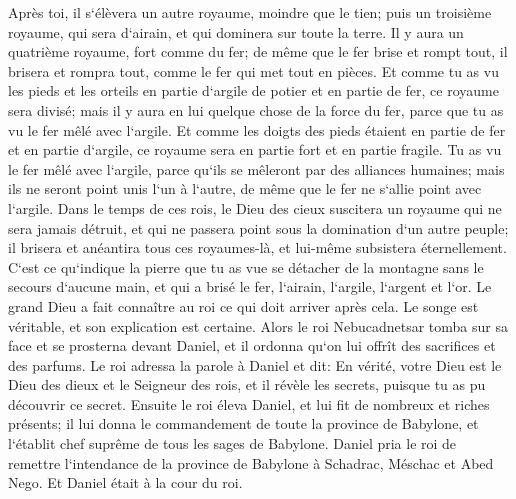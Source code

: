 \verse Après toi, il s`élèvera un autre royaume, moindre que le tien; puis un troisième royaume, qui sera d`airain, et qui dominera sur toute la terre. 
\verse Il y aura un quatrième royaume, fort comme du fer; de même que le fer brise et rompt tout, il brisera et rompra tout, comme le fer qui met tout en pièces. 
\verse Et comme tu as vu les pieds et les orteils en partie d`argile de potier et en partie de fer, ce royaume sera divisé; mais il y aura en lui quelque chose de la force du fer, parce que tu as vu le fer mêlé avec l`argile. 
\verse Et comme les doigts des pieds étaient en partie de fer et en partie d`argile, ce royaume sera en partie fort et en partie fragile. 
\verse Tu as vu le fer mêlé avec l`argile, parce qu`ils se mêleront par des alliances humaines; mais ils ne seront point unis l`un à l`autre, de même que le fer ne s`allie point avec l`argile. 
\verse Dans le temps de ces rois, le Dieu des cieux suscitera un royaume qui ne sera jamais détruit, et qui ne passera point sous la domination d`un autre peuple; il brisera et anéantira tous ces royaumes-là, et lui-même subsistera éternellement. 
\verse C`est ce qu`indique la pierre que tu as vue se détacher de la montagne sans le secours d`aucune main, et qui a brisé le fer, l`airain, l`argile, l`argent et l`or. Le grand Dieu a fait connaître au roi ce qui doit arriver après cela. Le songe est véritable, et son explication est certaine. 
\verse Alors le roi Nebucadnetsar tomba sur sa face et se prosterna devant Daniel, et il ordonna qu`on lui offrît des sacrifices et des parfums. 
\verse Le roi adressa la parole à Daniel et dit: En vérité, votre Dieu est le Dieu des dieux et le Seigneur des rois, et il révèle les secrets, puisque tu as pu découvrir ce secret. 
\verse Ensuite le roi éleva Daniel, et lui fit de nombreux et riches présents; il lui donna le commandement de toute la province de Babylone, et l`établit chef suprême de tous les sages de Babylone. 
\verse Daniel pria le roi de remettre l`intendance de la province de Babylone à Schadrac, Méschac et Abed Nego. Et Daniel était à la cour du roi. 

